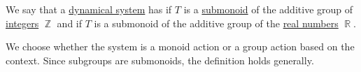 \begin{definition}\label{def:dynamical_system_time_classification}\mimprovised
  We say that a \hyperref[def:dynamical_system]{dynamical system} has  if \( T \) is a \hyperref[def:monoid/submodel]{submonoid} of the additive group of \hyperref[def:integers]{integers} \( \BbbZ \) and  if \( T \) is a submonoid of the additive group of the \hyperref[def:real_numbers]{real numbers} \( \BbbR \).
\end{definition}
\begin{comments}
  \item We choose whether the system is a monoid action or a group action based on the context. Since subgroups are submonoids, the definition holds generally.
\end{comments}

